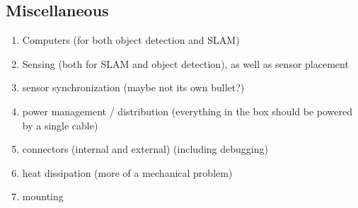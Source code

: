 \subsection{Miscellaneous}

\begin{enumerate}
	\item Computers (for both object detection and SLAM)
	\item Sensing (both for SLAM and object detection), as well as sensor placement 
	\item sensor synchronization (maybe not its own bullet?)
	\item power management / distribution (everything in the box should be powered by a single cable)
	\item connectors (internal and external) (including debugging)
	\item heat dissipation (more of a mechanical problem)
	\item mounting
\end{enumerate}